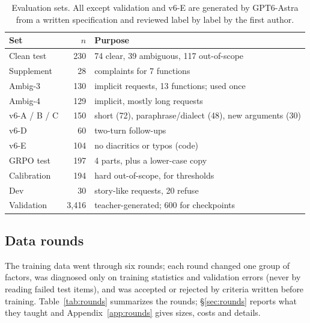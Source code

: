 \begin{table}[t]
\centering\small
\begin{tabular}{@{}lrp{3.7cm}@{}}
\toprule
Set & $n$ & Purpose \\
\midrule
Clean test & 230 & 74 clear, 39 ambiguous, 117 out-of-scope \\
Supplement & 28 & complaints for 7 functions \\
Ambig-3 & 130 & implicit requests, 13 functions; used once \\
Ambig-4 & 129 & implicit, mostly long requests \\
v6-A / B / C & 150 & short (72), paraphrase/dialect (48), new arguments (30) \\
v6-D & 60 & two-turn follow-ups \\
v6-E & 104 & no diacritics or typos (code) \\
GRPO test & 197 & 4 parts, plus a lower-case copy \\
Calibration & 194 & hard out-of-scope, for thresholds \\
Dev & 30 & story-like requests, 20 refuse \\
\midrule
Validation & 3,416 & teacher-generated; 600 for checkpoints \\
\bottomrule
\end{tabular}
\caption{Evaluation sets. All except validation and v6-E are generated by GPT6-Astra from a written specification and reviewed
label by label by the first author.}
\label{tab:evalsets}
\end{table}

\subsection{Data rounds}
\label{sec:datarounds}

The training data went through six rounds; each round changed one group of factors, was diagnosed only on training statistics
and validation errors (never by reading failed test items), and was accepted or rejected by criteria written before training.
Table~\ref{tab:rounds} summarizes the rounds; \S\ref{sec:rounds} reports what they taught and Appendix~\ref{app:rounds} gives
sizes, costs and details.

